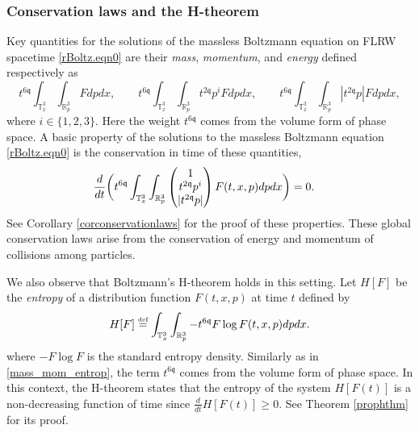 \documentclass[reqno]{amsart}
\newcommand{\eqdef }{\overset{\mbox{\tiny{def}}}{=}}
\newcommand{\qq}{\mathfrak{q}}
\theoremstyle{definition}
\numberwithin{equation}{section}
\numberwithin{theorem}{section}
\begin{document}
\subsubsection{Conservation laws and the H-theorem}\label{subsconserved}

Key quantities for the solutions of the massless Boltzmann equation on FLRW spacetime \eqref{rBoltz.eqn0} are their \emph{mass}, \emph{momentum}, and \emph{energy} defined respectively as
\begin{equation}\label{mass_mom_entrop}
t^{6\qq}\int_{\mathbb{T}^3_x}\int_{ \mathbb{R}^3_p} Fdpdx, \qquad t^{6\qq}\int_{\mathbb{T}^3_x}\int_{ \mathbb{R}^3_p} t^{2\qq}p^iFdpdx,\qquad t^{6\qq}\int_{\mathbb{T}^3_x}\int_{ \mathbb{R}^3_p} |t^{2\qq}p|Fdpdx,
\end{equation}
where \(i\in \{1,2,3\}\). Here the weight \(t^{6\qq}\) comes from the volume form of phase space. A basic property of the solutions to the massless Boltzmann equation \eqref{rBoltz.eqn0} is the conservation in time of these quantities,
\begin{align}\notag
\frac{d}{dt}\bigg(t^{6\mathfrak{q}}\int_{\mathbb{T}^3_x}\int_{ \mathbb{R}^3_p}  
\begin{pmatrix}
         1 \\ t^{2\mathfrak{q}}p^i\\ |t^{2\mathfrak{q}}p|
    \end{pmatrix} 
    F(t,x,p) dpdx\bigg)&=0.
\end{align}
See Corollary \ref{corconservationlaws} for the proof of these properties. These global conservation laws arise from the conservation of energy and momentum of collisions among particles. 


We also observe that Boltzmann's H-theorem holds in this setting. Let \(H[F]\) be the \emph{entropy} of a distribution function \(F(t,x,p)\) at time \(t\) defined by 
\begin{equation} \label{eq:defofentropy}
    H[F]\eqdef \int_{\mathbb{T}^3_x}\int_{ \mathbb{R}^3_p} - t^{6\qq} F\log F(t,x,p) dpdx.
\end{equation}
where \(-F \log F\) is the standard entropy density. Similarly as in \eqref{mass_mom_entrop}, the term \(t^{6\qq}\) comes from the volume form of phase space. In this context, the H-theorem states that the entropy of the system \(H[F(t)]\) is a non-decreasing function of time since
\(\frac{d}{dt}H[F(t)]\geq 0.\) See Theorem \ref{prophthm} for its proof. 
\end{document}
